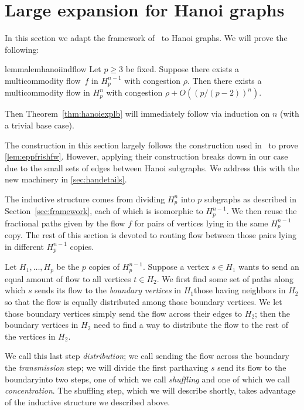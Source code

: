 \documentclass[
final
]{dmtcs-episciences}
\begin{document}
\section{Large expansion for Hanoi graphs}
\label{sec:hanoiexplb}
In this section we adapt the framework of~\cite{eppfrishtri} to Hanoi graphs. We will prove the following:

\begin{restatable}{lemma}{lemhanoiindflow}
\label{lem:hanoiindflow}
Let $p \geq 3$ be fixed. Suppose there exists a multicommodity flow~$f$ in $H_p^{n-1}$ with congestion $\rho$. Then there exists a multicommodity flow in $H_p^n$ with congestion $\rho + O((p/(p-2))^n)$.
\end{restatable}

Then Theorem~\ref{thm:hanoiexplb} will immediately follow via induction on $n$ (with a trivial base case).

The construction in this section largely follows the construction used in~\cite{eppfrishtri} to prove \cref{lem:eppfrishfw}. However, applying their construction breaks down in our case due to the small sets of edges between Hanoi subgraphs. We address this with the new machinery in \cref{sec:handetails}. 

The inductive structure comes from dividing $H_p^n$ into $p$ subgraphs as described in Section~\ref{sec:framework}, each of which is isomorphic to $H_p^{n-1}$. We then reuse the fractional paths given by the flow $f$ for pairs of vertices lying in the same $H_p^{n-1}$ copy. The rest of this section is devoted to routing flow between those pairs lying in different $H_p^{n-1}$ copies. 

Let $H_1, \dots, H_p$ be the $p$ copies of $H_p^{n-1}$. Suppose a vertex $s \in H_1$ wants to send an equal amount of flow to all vertices $t \in H_2$. We first find some set of paths along which $s$ sends its flow to the \emph{boundary vertices} in $H_1$\textemdash those having neighbors in $H_2$\textemdash so that the flow is equally distributed among those boundary vertices. We let those boundary vertices simply send the flow across their edges to $H_2$; then the boundary vertices in $H_2$ need to find a way to distribute the flow to the rest of the vertices in $H_2$.

We call this last step \emph{distribution}; we call sending the flow across the boundary the \emph{transmission} step; we will divide the first part\textemdash having $s$ send its flow to the boundary\textemdash into two steps, one of which we call \emph{shuffling} and one of which we call \emph{concentration}. The shuffling step, which we will describe shortly, takes advantage of the inductive structure we described above.
\end{document}
